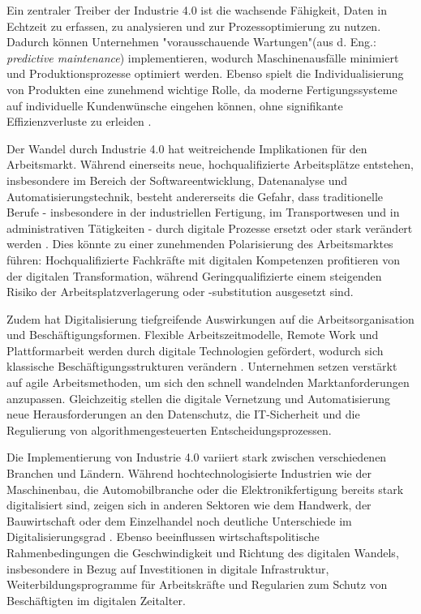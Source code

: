 Ein zentraler Treiber der Industrie 4.0 ist die wachsende Fähigkeit, Daten in Echtzeit zu 
erfassen, zu analysieren und zur Prozessoptimierung zu nutzen. Dadurch können Unternehmen 
"vorausschauende Wartungen"(aus d. Eng.: \textit{predictive maintenance}) implementieren, 
wodurch Maschinenausfälle minimiert und Produktionsprozesse optimiert werden. Ebenso 
spielt die Individualisierung von Produkten eine zunehmend wichtige Rolle, da moderne 
Fertigungssysteme auf individuelle Kundenwünsche eingehen können, ohne signifikante 
Effizienzverluste zu erleiden \parencite[S. 85]{bartodziej2016theconcept}.

Der Wandel durch Industrie 4.0 hat weitreichende Implikationen für den Arbeitsmarkt. 
Während einerseits neue, hochqualifizierte Arbeitsplätze entstehen, insbesondere im Bereich 
der Softwareentwicklung, Datenanalyse und Automatisierungstechnik, besteht andererseits 
die Gefahr, dass traditionelle Berufe - insbesondere in der industriellen Fertigung, im 
Transportwesen und in administrativen Tätigkeiten - durch digitale Prozesse ersetzt oder 
stark verändert werden \parencite[S. 40]{frey2013thefuture}. Dies könnte zu einer 
zunehmenden Polarisierung des Arbeitsmarktes führen: Hochqualifizierte Fachkräfte mit digitalen 
Kompetenzen profitieren von der digitalen Transformation, während Geringqualifizierte 
einem steigenden Risiko der Arbeitsplatzverlagerung oder -substitution ausgesetzt sind.

Zudem hat Digitalisierung tiefgreifende Auswirkungen auf die Arbeitsorganisation und 
Beschäftigungsformen. Flexible Arbeitszeitmodelle, Remote Work und Plattformarbeit werden 
durch digitale Technologien gefördert, wodurch sich klassische Beschäftigungsstrukturen 
verändern \parencite[S. 112]{schwab2016thefourth}. Unternehmen setzen verstärkt auf agile 
Arbeitsmethoden, um sich den schnell wandelnden Marktanforderungen anzupassen. 
Gleichzeitig stellen die digitale Vernetzung und Automatisierung neue Herausforderungen 
an den Datenschutz, die IT-Sicherheit und die Regulierung von algorithmengesteuerten 
Entscheidungsprozessen.

Die Implementierung von Industrie 4.0 variiert stark zwischen verschiedenen Branchen und 
Ländern. Während hochtechnologisierte Industrien wie der Maschinenbau, die 
Automobilbranche oder die Elektronikfertigung bereits stark digitalisiert sind, zeigen 
sich in anderen Sektoren wie dem Handwerk, der Bauwirtschaft oder dem Einzelhandel noch 
deutliche Unterschiede im Digitalisierungsgrad 
\parencite[S. 77]{brennen2016theinternational}. Ebenso beeinflussen wirtschaftspolitische 
Rahmenbedingungen die Geschwindigkeit und Richtung des digitalen Wandels, insbesondere in 
Bezug auf Investitionen in digitale Infrastruktur, Weiterbildungsprogramme für 
Arbeitskräfte und Regularien zum Schutz von Beschäftigten im digitalen Zeitalter.

